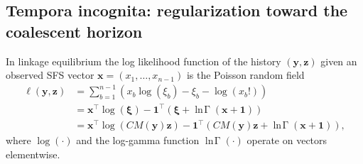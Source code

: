 \documentclass[11pt]{article}
\DeclareMathOperator{\lngamma}{\ln\!\Gamma}
\begin{document}
\subsection{Tempora incognita: regularization toward the coalescent horizon}\label{sec:model:loss}

In linkage equilibrium the log likelihood function of the history $(\boldsymbol y, \boldsymbol z)$ given an observed SFS vector $\boldsymbol x = (x_1,\dots,x_{n-1})$ is the Poisson random field \citep{}
\begin{align}
\ell(\boldsymbol y, \boldsymbol z) &= \sum_{b=1}^{n-1}\left(x_b\log(\xi_b) - \xi_b - \log(x_b!)\right)\\
&= \boldsymbol x^\intercal\log(\boldsymbol\xi) - \boldsymbol 1^\intercal\left(\boldsymbol\xi + \lngamma(\boldsymbol x + \boldsymbol 1)\right)\\
&= \boldsymbol x^\intercal\log(C M(\boldsymbol y) \boldsymbol z) - \boldsymbol 1^\intercal\left(C M(\boldsymbol y) \boldsymbol z + \lngamma(\boldsymbol x + \boldsymbol 1)\right),
\end{align}
where $\log(\cdot)$ and the log-gamma function $\lngamma(\cdot)$ operate on vectors elementwise.
\end{document}
